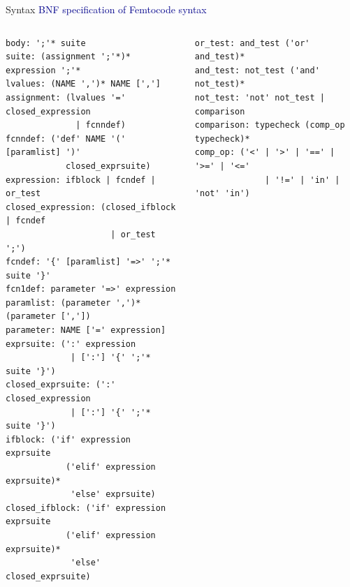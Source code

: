 \documentclass{beamer}
\begin{document}
\begin{frame}[fragile]{Syntax}
\vspace{0.25 cm}
\textcolor{darkblue}{BNF specification of Femtocode syntax} 

\vspace{-0.5 cm}
\begin{columns}[t]
\tiny
\begin{verbatim}body: ';'* suite
suite: (assignment ';'*)* expression ';'*
lvalues: (NAME ',')* NAME [',']
assignment: (lvalues '=' closed_expression
              | fcnndef)
fcnndef: ('def' NAME '(' [paramlist] ')'
            closed_exprsuite)
expression: ifblock | fcndef | or_test
closed_expression: (closed_ifblock | fcndef
                     | or_test ';')
fcndef: '{' [paramlist] '=>' ';'* suite '}'
fcn1def: parameter '=>' expression
paramlist: (parameter ',')* (parameter [','])
parameter: NAME ['=' expression]
exprsuite: (':' expression
             | [':'] '{' ';'* suite '}')
closed_exprsuite: (':' closed_expression
             | [':'] '{' ';'* suite '}')
ifblock: ('if' expression exprsuite
            ('elif' expression exprsuite)*
             'else' exprsuite)
closed_ifblock: ('if' expression exprsuite
            ('elif' expression exprsuite)*
             'else' closed_exprsuite)
\end{verbatim}
\vspace{-0.8 cm}
\begin{verbatim}or_test: and_test ('or' and_test)*
and_test: not_test ('and' not_test)*
not_test: 'not' not_test | comparison
comparison: typecheck (comp_op typecheck)*
comp_op: ('<' | '>' | '==' | '>=' | '<='
              | '!=' | 'in' | 'not' 'in')
\end{verbatim}


\end{columns}
\end{frame}
\end{document}
